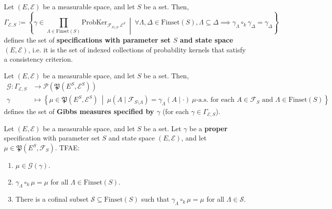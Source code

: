 \begin{definition}[Specification]
    \label{def:specification}
    \leanok
    Let $(E,\mathcal{E})$ be a measurable space, and let $S$ be a set. Then,
    \begin{equation*}
        \Gamma_{\mathcal{E},S}:=\left\{\gamma\in\prod_{\Lambda\in\text{Finset}(S)}\text{ProbKer}_{\mathcal{F}_{S\setminus\Lambda},\mathcal{E}^S}~\middle\vert~ \forall \Lambda,\Delta\in\text{Finset}(S),\Lambda\subseteq\Delta\implies\gamma_\Lambda\circ_k\gamma_\Delta=\gamma_\Delta\right\}
    \end{equation*}
    defines the set of \textbf{specifications with parameter set $S$ and state space $(E,\mathcal{E})$}, i.e. it is the set of indexed collections of probability kernels that satisfy a consistency criterion.
\end{definition}

\begin{definition}
    \label{def:gibbs-measure}

    Let $(E,\mathcal{E})$ be a measurable space, and let $S$ be a set. Then,
    \begin{align*}
        \mathcal{G}:\Gamma_{\mathcal{E},S}&\to\mathcal{P}(\mathfrak{P}(E^S,\mathcal{E}^S))\\
        \gamma&\mapsto\left\{\mu\in\mathfrak{P}(E^S,\mathcal{E}^S)~\middle\vert~\mu(A\mid\mathcal{F}_{S\setminus\Lambda})=\gamma_\Lambda(A\mid\cdot)~\mu\text{-a.s. for each } A\in\mathcal{F}_S\text{ and }\Lambda\in\text{Finset}(S)\right\}
    \end{align*}
    defines the set of \textbf{Gibbs measures specified by $\gamma$} (for each $\gamma\in\Gamma_{\mathcal{E},S}$).
\end{definition}

\begin{lemma}
    \label{lem:gibbs-measure-char}

    Let $(E,\mathcal{E})$ be a measurable space, and let $S$ be a set. Let $\gamma$ be a \textbf{proper} specification with parameter set $S$ and state space $(E,\mathcal{E})$, and let $\mu\in\mathfrak{P}(E^S,\mathcal{F}_S)$. TFAE:
    \begin{enumerate}
        \item $\mu\in\mathcal{G}(\gamma)$.
        \item $\gamma_\Lambda\circ_k\mu=\mu$ for all $\Lambda\in\text{Finset}(S)$.
        \item There is a cofinal subset $\mathcal{S}\subseteq\text{Finset}(S)$ such that $\gamma_\Lambda\circ_k\mu=\mu$ for all $\Lambda\in\mathcal{S}$.
    \end{enumerate}
\end{lemma}

